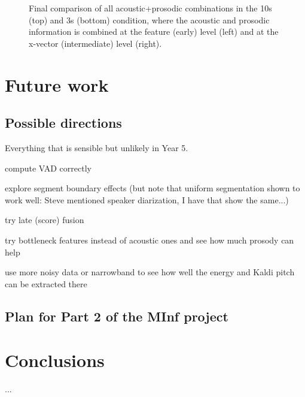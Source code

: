 \documentclass[bsc,frontabs,twoside,singlespacing,parskip,deptreport]{infthesis}
\begin{document}
{\begin{figure}[h!]
\begin{minipage}{0.49\textwidth}
      \label{fig:summary-intermediate-3s}
    \end{minipage}
    \caption{Final comparison of all acoustic+prosodic combinations in the 10s (top) and 3s (bottom) condition, where the acoustic and prosodic information is combined at the feature (early) level (left) and at the x-vector (intermediate) level (right).}
    \label{fig:summary-barplots}
  \end{figure}
}

\chapter{Future work}{
  \label{chap:future-work}

  \section{Possible directions}{
    Everything that is sensible but unlikely in Year 5.

    compute VAD correctly

    explore segment boundary effects (but note that uniform segmentation shown to work well: Steve mentioned speaker diarization, I have \citet{Martinez_et_al_2013} that show the same...)

    try late (score) fusion

    try bottleneck features instead of acoustic ones and see how much prosody can help

    use more noisy data or narrowband to see how well the energy and Kaldi pitch can be extracted there
  }

  \section{Plan for Part 2 of the MInf project}{

  }
}

\chapter{Conclusions}{
  \label{chap:conclusions}
  ...
}




\appendix
\end{document}
